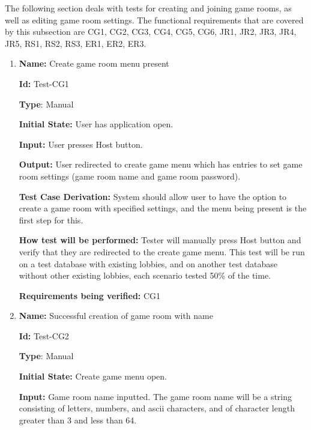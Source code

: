 \documentclass[12pt, titlepage]{article}
\begin{document}
		
The following section deals with tests for creating and joining game rooms, as well as editing game room settings. The functional requirements that are covered by this subsection are CG1, CG2, CG3, CG4, CG5, CG6, JR1, JR2, JR3, JR4, JR5, RS1, RS2, RS3, ER1, ER2, ER3.

\begin{enumerate}

\item{\textbf{Name:} Create game room menu present} \label{itm:Test-CG1}

\textbf{Id:} Test-CG1

\textbf{Type}: Manual

\textbf{Initial State:} User has application open.

\textbf{Input:} User presses Host button.

\textbf{Output:} User redirected to create game menu which has entries to set game room settings (game room name and game room password).

\textbf{Test Case Derivation:} System should allow user to have the option to create a game room with specified settings, and the menu being present is the first step for this.

\textbf{How test will be performed:} Tester will manually press Host button and verify that they are redirected to the create game menu. This test will be run on a test database with existing lobbies, and on another test database without other existing lobbies, each scenario tested 50\% of the time.

\textbf{Requirements being verified:}  CG1

\item{\textbf{Name:} Successful creation of game room with name}
\label{itm:Test-CG2}

\textbf{Id:} Test-CG2

\textbf{Type}: Manual

\textbf{Initial State:} Create game menu open.

\textbf{Input:} Game room name inputted. The game room name will be a string consisting of letters, numbers, and ascii characters, and of character length greater than 3 and less than 64. 


\end{enumerate}
\end{document}
